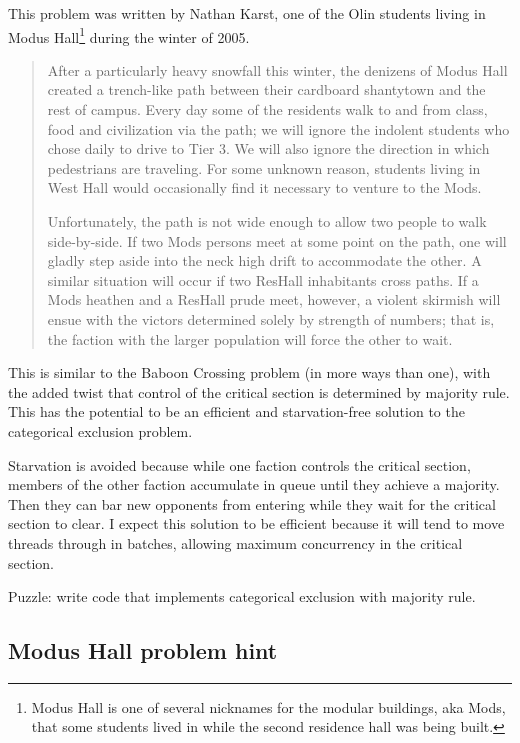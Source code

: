 \documentclass{book}
\newcommand{\clearemptydoublepage}{\newpage\cleardoublepage}
\begin{document}
This problem was written by Nathan Karst, one of the Olin students
living in Modus Hall\footnote{Modus Hall is one of several nicknames
for the modular buildings, aka Mods, that some students lived in while
the second residence hall was being built.} during the winter of 2005.

\begin{quote}
After a particularly heavy snowfall this winter, the denizens of Modus
Hall created a trench-like path between their cardboard shantytown and
the rest of campus.  Every day some of the residents walk to and from
class, food and civilization via the path; we will ignore the
indolent students who chose daily to drive to Tier 3.  We will also
ignore the direction in which pedestrians are traveling.  For some
unknown reason, students living in West Hall would occasionally find it
necessary to venture to the Mods.

Unfortunately, the path is not wide enough to allow two people
to walk side-by-side.  If two Mods persons meet at some point on the
path, one will gladly step aside into the neck high drift to accommodate
the other.  A similar situation will occur if two ResHall inhabitants
cross paths.  If a Mods heathen and a ResHall prude meet, however, a
violent skirmish will ensue with the victors determined solely by
strength of numbers; that is, the faction with the larger population will
force the other to wait.
\end{quote}

This is similar to the Baboon Crossing problem (in more ways than
one), with the added twist that control of the critical section is
determined by majority rule.  This has the potential to be an
efficient and starvation-free solution to the categorical exclusion
problem.

Starvation is avoided because while one faction controls the critical
section, members of the other faction accumulate in queue until they
achieve a majority.  Then they can bar new opponents from entering
while they wait for the critical section to clear.  I expect this
solution to be efficient because it will tend to move threads through
in batches, allowing maximum concurrency in the critical section.

Puzzle: write code that implements categorical exclusion with
majority rule.



\clearemptydoublepage
\subsection {Modus Hall problem hint}
\end{document}
